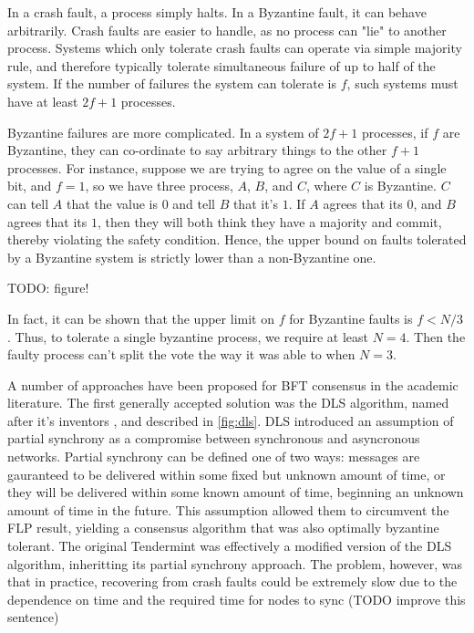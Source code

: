 In a crash fault, a process simply halts. In a Byzantine fault, it can behave arbitrarily.
Crash faults are easier to handle, as no process can "lie" to another process.
Systems which only tolerate crash faults can operate via simple majority rule, 
and therefore typically tolerate simultaneous failure of up to half of the system.
If the number of failures the system can tolerate is $f$, such systems must have at least $2f+1$ processes.

Byzantine failures are more complicated. In a system of $2f+1$ processes, if $f$ are Byzantine, 
they can co-ordinate to say arbitrary things to the other $f+1$ processes.
For instance, suppose we are trying to agree on the value of a single bit, 
and $f=1$, so we have three process, $A$, $B$, and $C$, where $C$ is Byzantine.
$C$ can tell $A$ that the value is $0$ and tell $B$ that it's $1$. 
If $A$ agrees that its $0$, and $B$ agrees that its $1$, then they will both think they have a majority and commit, 
thereby violating the safety condition.
Hence, the upper bound on faults tolerated by a Byzantine system is strictly lower than a non-Byzantine one.

TODO: figure!

In fact, it can be shown that the upper limit on $f$ for Byzantine faults is $f < N/3$ \cite{pease1980reaching}.
Thus, to tolerate a single byzantine process, we require at least $N=4$. 
Then the faulty process can't split the vote the way it was able to when $N=3$.

A number of approaches have been proposed for BFT consensus in the academic literature.
The first generally accepted solution was the DLS algorithm, named after it's inventors \cite{dls}, and described in \ref{fig:dls}.
DLS introduced an assumption of partial synchrony as a compromise between synchronous and asyncronous networks.
Partial synchrony can be defined one of two ways: 
messages are gauranteed to be delivered within some fixed but unknown amount of time,
or they will be delivered within some known amount of time, beginning an unknown amount of time in the future.
This assumption allowed them to circumvent the FLP result, yielding a consensus algorithm that was also optimally byzantine tolerant.
The original Tendermint was effectively a modified version of the DLS algorithm, inheritting its partial synchrony approach.
The problem, however, was that in practice, recovering from crash faults could be extremely slow due to the dependence on time and the required time for nodes to sync (TODO improve this sentence)

